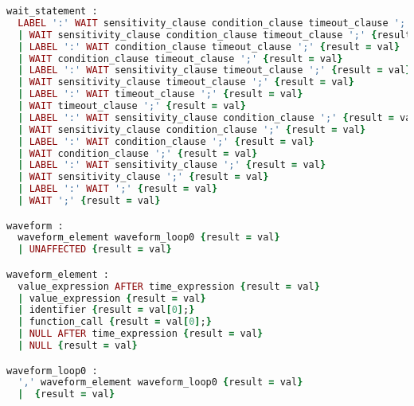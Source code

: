 \begin{lstlisting}[language=Ruby, style=rubystyle]
wait_statement :
  LABEL ':' WAIT sensitivity_clause condition_clause timeout_clause ';' {result = val}
  | WAIT sensitivity_clause condition_clause timeout_clause ';' {result = val}
  | LABEL ':' WAIT condition_clause timeout_clause ';' {result = val}
  | WAIT condition_clause timeout_clause ';' {result = val}
  | LABEL ':' WAIT sensitivity_clause timeout_clause ';' {result = val}
  | WAIT sensitivity_clause timeout_clause ';' {result = val}
  | LABEL ':' WAIT timeout_clause ';' {result = val}
  | WAIT timeout_clause ';' {result = val}
  | LABEL ':' WAIT sensitivity_clause condition_clause ';' {result = val}
  | WAIT sensitivity_clause condition_clause ';' {result = val}
  | LABEL ':' WAIT condition_clause ';' {result = val}
  | WAIT condition_clause ';' {result = val}
  | LABEL ':' WAIT sensitivity_clause ';' {result = val}
  | WAIT sensitivity_clause ';' {result = val}
  | LABEL ':' WAIT ';' {result = val}
  | WAIT ';' {result = val}

waveform :
  waveform_element waveform_loop0 {result = val}
  | UNAFFECTED {result = val}

waveform_element :
  value_expression AFTER time_expression {result = val}
  | value_expression {result = val}
  | identifier {result = val[0];}
  | function_call {result = val[0];}
  | NULL AFTER time_expression {result = val}
  | NULL {result = val}

waveform_loop0 :
  ',' waveform_element waveform_loop0 {result = val}
  |  {result = val}



\end{lstlisting}
